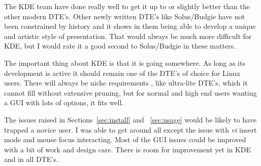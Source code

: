 \documentclass{article}  %
\begin{document}
The KDE team have done really well to get it up to or slightly better than the other modern DTE's. Other newly written DTE's like Solus/Budgie have not been constrained by history and it shows in them being able to develop a unique and artistic style of presentation. That would always be much more difficult for KDE, but I would rate it a good second to Solus/Budgie in these matters.

The important thing about KDE is that it is going somewhere. As long as its development is active it should remain one of the DTE's of choice for Linux users.  There will always be niche requirements , like ultra-lite DTE's, which it cannot fill without extensive pruning, but for normal and high end users wanting a GUI with lots of options, it fits well. 

The issues raised in Sections~\ref{sec:install} and ~\ref{sec:usage} would be likely to have trapped a novice user.  I was able to get around all except the issue with {\em vi} insert mode and mouse focus interacting. Most of the GUI issues could be improved with a bit of work and design care. There is room for improvement yet in KDE and in all DTE's.
 
\end{document}

